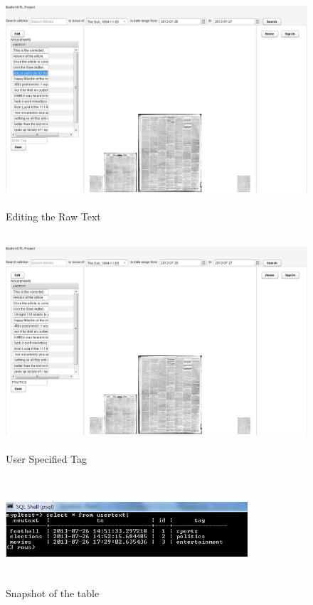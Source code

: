 \documentclass[12pt]{article}
\begin{document}
\begin{figure}[H]
\centering
\includegraphics[width=14cm,height=8cm]{editing.jpg}
\caption{Editing the Raw Text}
\label{fig:9}
\end{figure}

\begin{figure}[H]
\centering
\includegraphics[width=14cm,height=8cm]{tag.jpg}
\caption{User Specified Tag}
\label{fig:10}
\end{figure}

\begin{figure}[H]
\centering
\includegraphics[width=9cm,height=4cm]{db.jpg}
\caption{Snapshot of the table}
\label{fig:11}
\end{figure}
\end{document}
